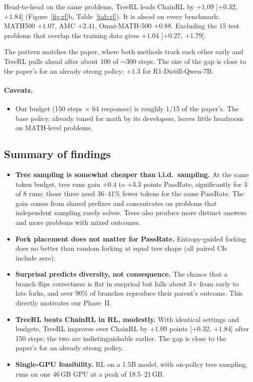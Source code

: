 Head-to-head on the same problems, TreeRL leads ChainRL by $+1.09$ [$+0.32$, $+1.84$] (Figure~\ref{fig:rl}b, Table~\ref{tab:rl}). It is ahead on every benchmark: MATH500 $+1.07$, AMC $+2.41$, Omni-MATH-500 $+0.88$. Excluding the 15 test problems that overlap the training data gives $+1.04$ [$+0.27$, $+1.79$].

The pattern matches the paper, where both methods track each other early and TreeRL pulls ahead after about 100 of $\sim$300 steps. The size of the gap is close to the paper's for an already strong policy: $+1.3$ for R1-Distill-Qwen-7B.

\paragraph{Caveats.}
\begin{itemize}
\item Our budget (150 steps $\times$ 64 responses) is roughly 1/15 of the paper's. The base policy, already tuned for math by its developers, leaves little headroom on MATH-level problems.
\end{itemize}

\subsection{Summary of findings}
\label{sec:summary}
\begin{itemize}
\item \textbf{Tree sampling is somewhat cheaper than i.i.d.\ sampling.} At the same token budget, tree runs gain $+0.4$ to $+3.3$ points PassRate, significantly for 3 of 8 runs; those three need 36--41\% fewer tokens for the same PassRate. The gain comes from shared prefixes and concentrates on problems that independent sampling rarely solves. Trees also produce more distinct answers and more problems with mixed outcomes.
\item \textbf{Fork placement does not matter for PassRate.} Entropy-guided forking does no better than random forking at equal tree shape (all paired CIs include zero).
\item \textbf{Surprisal predicts diversity, not consequence.} The chance that a branch flips correctness is flat in surprisal but falls about 3$\times$ from early to late forks, and over 90\% of branches reproduce their parent's outcome. This directly motivates our Phase~II.
\item \textbf{TreeRL beats ChainRL in RL, modestly.} With identical settings and budgets, TreeRL improves over ChainRL by $+1.09$ points [$+0.32$, $+1.84$] after 150 steps; the two are indistinguishable earlier. The gap is close to the paper's for an already strong policy.
\item \textbf{Single-GPU feasibility.} RL on a 1.5B model, with on-policy tree sampling, runs on one 46\,GB GPU at a peak of 18.5--21\,GB.
\end{itemize}

